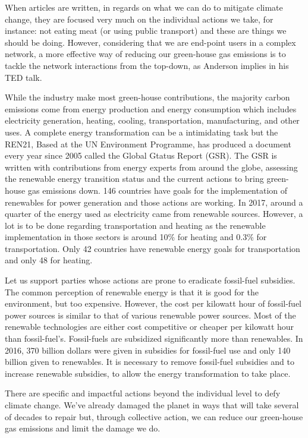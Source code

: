 \documentclass[11pt,a4paper]{article}
\begin{document}
When articles are written, in regards on what we can do to mitigate climate change, they are focused very much on the individual actions we take, for instance: not eating meat \parencite{Milman2018} (or using public transport) and these are things we should be doing. However, considering that we are end-point users in a complex network, a more effective way of reducing our green-house gas emissions is to tackle the network interactions from the top-down, as Anderson implies in his TED talk.

While the industry make most green-house contributions, the majority carbon emissions come from energy production and energy consumption which includes electricity generation, heating, cooling, transportation, manufacturing, and other uses. A complete energy transformation can be a intimidating task but the REN21, Based at the UN Environment Programme, has produced a document every year since 2005 called the Global Gtatus Report (GSR). The GSR is written with contributions from energy experts from around the globe, assessing the renewable energy transition status and the current actions to bring green-house gas emissions down. 146 countries have goals for the implementation of renewables for power generation and those actions are working. In 2017, around a quarter of the energy used as electricity came from renewable sources. However, a lot is to be done regarding transportation and heating as the renewable implementation in those sectors is around 10\% for heating and 0.3\% for transportation. Only 42 countries have renewable energy goals for transportation and only 48 for heating. \parencite{REN21}

Let us support parties whose actions are prone to eradicate fossil-fuel subsidies. The common perception of renewable energy is that it is good for the environment, but too expensive. However, the cost per kilowatt hour of fossil-fuel power sources is similar to that of various renewable power sources. Most of the renewable technologies are either cost competitive or cheaper per kilowatt hour than fossil-fuel's. Fossil-fuels are subsidized significantly more than renewables. In 2016, 370 billion dollars were given in subsidies for fossil-fuel use and only 140 billion given to renewables. It is necessary to remove fossil-fuel subsidies and to increase renewable subsidies, to allow the energy transformation to take place. \parencite{REN21}

There are specific and impactful actions beyond the individual level to defy climate change. We've already damaged the planet in ways that will take several of decades to repair but, through collective action, we can reduce our green-house gas emissions and limit the damage we do. %


\clearpage
\printbibliography

\end{document}

